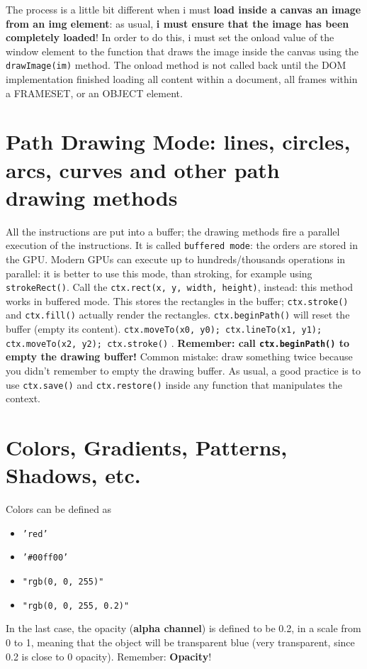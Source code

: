 \documentclass[a4paper,11pt]{book}
\begin{document}
	The process is a little bit different when i must \textbf{load inside a canvas an image from an img element}:
	as usual, \textbf{i must ensure that the image has been completely loaded}! In order to do this, i must set the onload
	value of the window element to the function that draws the image inside the canvas using the
	\texttt{drawImage(im)} method. The onload method is not called back until the DOM implementation finished loading
	all content within a document, all frames within a FRAMESET, or an OBJECT element.

\section{Path Drawing Mode: lines, circles, arcs, curves and other path drawing methods}
All the instructions are put into a buffer; the drawing methods fire a parallel execution of the instructions.
It is called \texttt{buffered mode}: the orders are stored in the GPU. Modern GPUs can execute up to hundreds/thousands
operations in parallel: it is better to use this mode, than stroking, for example using \texttt{strokeRect()}.
Call the \texttt{ctx.rect(x, y, width, height)}, instead: this method works in buffered mode. This stores the
rectangles in the buffer; \texttt{ctx.stroke()} and \texttt{ctx.fill()} actually render the rectangles.
\texttt{ctx.beginPath()} will reset the buffer (empty its content).
\texttt{ctx.moveTo(x0, y0); ctx.lineTo(x1, y1); ctx.moveTo(x2, y2); ctx.stroke()} .
\textbf{Remember: call \texttt{ctx.beginPath()} to empty the drawing buffer!} Common mistake: draw something twice because you
didn't remember to empty the drawing buffer. As usual, a good practice is to use \texttt{ctx.save()} and
\texttt{ctx.restore()} inside any function that manipulates the context.

\section{Colors, Gradients, Patterns, Shadows, etc.}
Colors can be defined as
\begin{itemize}
\item \texttt{'red'}
\item \texttt{'\#00ff00'}
\item \texttt{"rgb(0, 0, 255)"}
\item \texttt{"rgb(0, 0, 255, 0.2)"}
\end{itemize}
In the last case, the opacity (\textbf{alpha channel}) is defined to be 0.2, in a scale from 0 to 1, meaning that
the object will be transparent blue (very transparent, since 0.2 is close to 0 opacity). Remember: \textbf{Opacity}!
\end{document}
